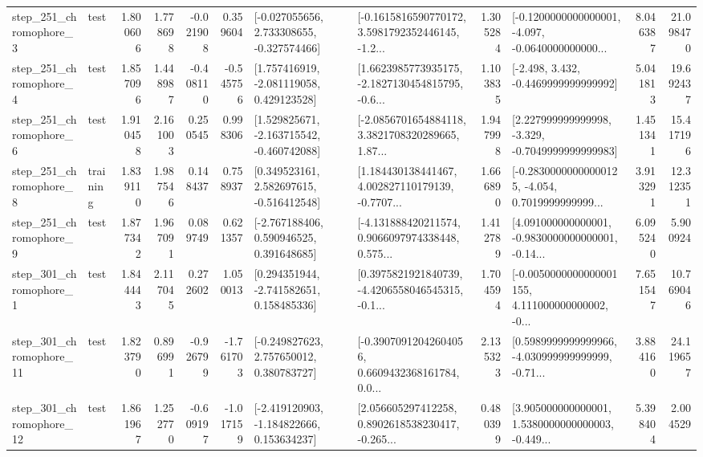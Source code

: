 \begin{tabular}{llrrrrllrlrr}
   step\_251\_chromophore\_3 &      test &      1.800606 &    1.778698 &     -0.021908 &  0.359604 &   [-0.027055656, 2.733308655, -0.327574466] &  [-0.1615816590770172, 3.5981792352446145, -1.2... &       1.305284 &  [-0.1200000000000001, -4.097, -0.0640000000000... &            8.046387 &         21.098470 \\
   step\_251\_chromophore\_4 &      test &      1.857096 &    1.448987 &     -0.408110 & -0.545756 &    [1.757416919, -2.081119058, 0.429123528] &  [1.6623985773935175, -2.1827130454815795, -0.6... &       1.103835 &               [-2.498, 3.432, -0.4469999999999992] &            5.041813 &         19.692437 \\
   step\_251\_chromophore\_6 &      test &      1.910458 &    2.161003 &      0.250545 &  0.998306 &   [1.529825671, -2.163715542, -0.460742088] &  [-2.0856701654884118, 3.3821708320289665, 1.87... &       1.947998 &   [2.227999999999998, -3.329, -0.7049999999999983] &            1.451341 &         15.417196 \\
   step\_251\_chromophore\_8 &  training &      1.839110 &    1.987546 &      0.148437 &  0.758937 &    [0.349523161, 2.582697615, -0.516412548] &  [1.184430138441467, 4.002827110179139, -0.7707... &       1.666890 &  [-0.28300000000000125, -4.054, 0.7019999999999... &            3.913291 &         12.312351 \\
   step\_251\_chromophore\_9 &      test &      1.877342 &    1.967091 &      0.089749 &  0.621357 &    [-2.767188406, 0.590946525, 0.391648685] &  [-4.131888420211574, 0.9066097974338448, 0.575... &       1.412789 &  [4.091000000000001, -0.9830000000000001, -0.14... &            6.095240 &          5.900924 \\
   step\_301\_chromophore\_1 &      test &      1.844443 &    2.117045 &      0.272602 &  1.050013 &    [0.294351944, -2.741582651, 0.158485336] &  [0.3975821921840739, -4.4206558046545315, -0.1... &       1.704594 &  [-0.0050000000000001155, 4.111000000000002, -0... &            7.651547 &         10.769046 \\
  step\_301\_chromophore\_11 &      test &      1.823790 &    0.896991 &     -0.926799 & -1.761703 &    [-0.249827623, 2.757650012, 0.380783727] &  [-0.39070912042604056, 0.6609432368161784, 0.0... &       2.135323 &  [0.5989999999999966, -4.030999999999999, -0.71... &            3.884160 &         24.119657 \\
  step\_301\_chromophore\_12 &      test &      1.861967 &    1.252770 &     -0.609197 & -1.017159 &   [-2.419120903, -1.184822666, 0.153634237] &  [2.056605297412258, 0.8902618538230417, -0.265... &       0.480399 &  [3.905000000000001, 1.5380000000000003, -0.449... &            5.398404 &          2.004529 \\

\end{tabular}
